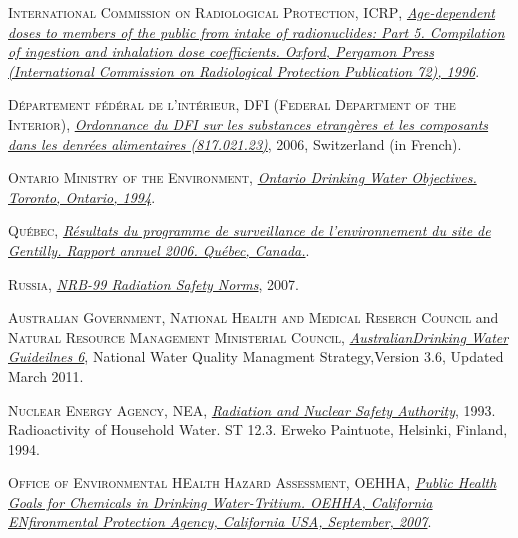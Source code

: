 \begin{thebibliography}{100}
 \textsc{International Commission on Radiological Protection, ICRP}, 
\href{https://www.icrp.org/publication.asp?id=ICRP\%20Publication\%2072}{\textit{Age-dependent doses to members of the public from intake of radionuclides: Part 5. Compilation of ingestion and inhalation dose coefficients. Oxford, Pergamon Press (International Commission on Radiological Protection Publication 72), 1996}}. 

 \textsc{Département fédéral de l'intérieur, DFI (Federal Department of the Interior)},
\href{www.admin.ch/ch/f/rs/8/817.021.23.fr.pdf}{\textit{Ordonnance du DFI sur les substances etrangères et les composants dans les denrées alimentaires (817.021.23)}}, 2006, Switzerland (in French).

 \textsc{Ontario Ministry of the Environment},
\href{https://atrium.lib.uoguelph.ca/xmlui/handle/10214/15832}{\textit{Ontario Drinking Water Objectives. Toronto, Ontario, 1994}}. 

 \textsc{Québec},
\href{https://numerique.banq.qc.ca/patrimoine/details/52327/3582272?docref=fxoJ-qgA5cus5Upw-L_NHg}{\textit{Résultats du programme de surveillance de l’environnement du site de Gentilly. Rapport annuel 2006. Québec, Canada.}}. 

 \textsc{Russia},
\href{http://www.wdcb.ru/mining/zakon/NRB99.htm}{\textit{NRB-99 Radiation Safety Norms}}, 2007. 

 \textsc{Australian Government}, \textsc{National Health and Medical Reserch Council} and \textsc{Natural Resource Management Ministerial Council},
\href{https://www.nhmrc.gov.au/about-us/publications/australian-drinking-water-guidelines}{\textit{AustralianDrinking Water Guideilnes 6}}, National Water Quality Managment Strategy,Version 3.6, Updated March 2011. 

 \textsc{Nuclear Energy Agency, NEA},
\href{https://www.oecd-nea.org/jcms/pl_23551/finland}{\textit{Radiation and Nuclear Safety Authority}}, 1993. Radioactivity of Household Water. ST 12.3. Erweko Paintuote, Helsinki, Finland, 1994. 

 \textsc{Office of Environmental HEalth Hazard Assessment, OEHHA},
\href{https://oehha.ca.gov/water/public-health-goal/public-health-goals-six-chemicals-drinking-water}{\textit{Public Health Goals for Chemicals in Drinking Water-Tritium. OEHHA, California ENfironmental Protection Agency, California USA, September, 2007}}. 


\end{thebibliography}
